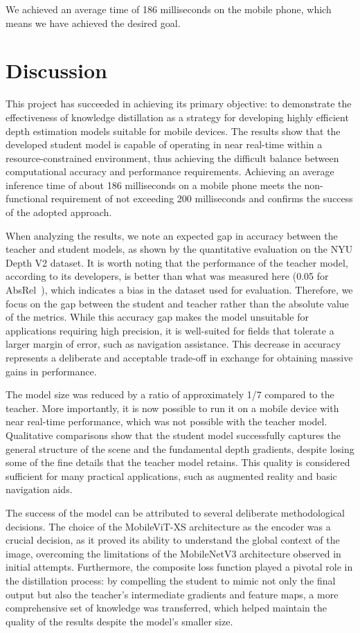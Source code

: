 We achieved an average time of 186 milliseconds on the mobile phone, which means we have achieved the desired goal.

\section{Discussion}
\label{sec:discussion}

This project has succeeded in achieving its primary objective: to demonstrate the effectiveness of knowledge distillation as a strategy for developing highly efficient depth estimation models suitable for mobile devices. The results show that the developed student model is capable of operating in near real-time within a resource-constrained environment, thus achieving the difficult balance between computational accuracy and performance requirements. Achieving an average inference time of about 186 milliseconds on a mobile phone meets the non-functional requirement of not exceeding 200 milliseconds and confirms the success of the adopted approach.

When analyzing the results, we note an expected gap in accuracy between the teacher and student models, as shown by the quantitative evaluation on the NYU Depth V2 dataset. It is worth noting that the performance of the teacher model, according to its developers, is better than what was measured here (0.05 for AbsRel~\cite{yang2024depthV2}), which indicates a bias in the dataset used for evaluation. Therefore, we focus on the gap between the student and teacher rather than the absolute value of the metrics. While this accuracy gap makes the model unsuitable for applications requiring high precision, it is well-suited for fields that tolerate a larger margin of error, such as navigation assistance. This decrease in accuracy represents a deliberate and acceptable trade-off in exchange for obtaining massive gains in performance.

The model size was reduced by a ratio of approximately 1/7 compared to the teacher. More importantly, it is now possible to run it on a mobile device with near real-time performance, which was not possible with the teacher model. Qualitative comparisons show that the student model successfully captures the general structure of the scene and the fundamental depth gradients, despite losing some of the fine details that the teacher model retains. This quality is considered sufficient for many practical applications, such as augmented reality and basic navigation aids.

The success of the model can be attributed to several deliberate methodological decisions. The choice of the MobileViT-XS architecture as the encoder was a crucial decision, as it proved its ability to understand the global context of the image, overcoming the limitations of the MobileNetV3 architecture observed in initial attempts. Furthermore, the composite loss function played a pivotal role in the distillation process: by compelling the student to mimic not only the final output but also the teacher's intermediate gradients and feature maps, a more comprehensive set of knowledge was transferred, which helped maintain the quality of the results despite the model's smaller size.

